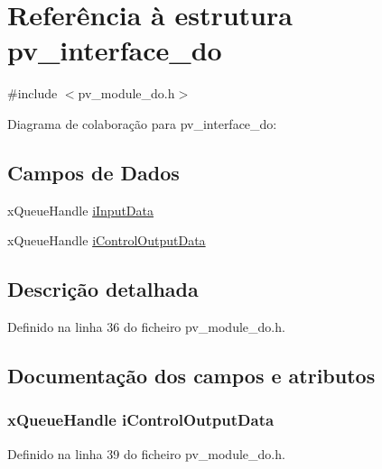 \hypertarget{structpv__interface__do}{\section{Referência à estrutura pv\-\_\-interface\-\_\-do}
\label{structpv__interface__do}
}


{\ttfamily \#include $<$pv\-\_\-module\-\_\-do.\-h$>$}



Diagrama de colaboração para pv\-\_\-interface\-\_\-do\-:
\subsection*{Campos de Dados}
\begin{DoxyCompactItemize}
\item 
x\-Queue\-Handle \hyperlink{structpv__interface__do_ad057767ef15274f0933ad1821fea7239}{i\-Input\-Data}
\item 
x\-Queue\-Handle \hyperlink{structpv__interface__do_a47359dc53fe6c9e48eae67c40f5bde8a}{i\-Control\-Output\-Data}
\end{DoxyCompactItemize}


\subsection{Descrição detalhada}


Definido na linha 36 do ficheiro pv\-\_\-module\-\_\-do.\-h.



\subsection{Documentação dos campos e atributos}
\hypertarget{structpv__interface__do_a47359dc53fe6c9e48eae67c40f5bde8a}{
\subsubsection[{i\-Control\-Output\-Data}]{\setlength{\rightskip}{0pt plus 5cm}x\-Queue\-Handle i\-Control\-Output\-Data}}\label{structpv__interface__do_a47359dc53fe6c9e48eae67c40f5bde8a}


Definido na linha 39 do ficheiro pv\-\_\-module\-\_\-do.\-h.

